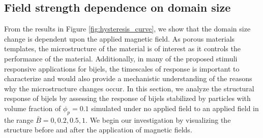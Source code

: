 \subsection{Field strength dependence on domain size}
\label{section:field-strength-dependence-on-domain-size}

From the results in Figure \ref{fig:hysteresis_curve}, we show that the domain size change is dependent upon the applied magnetic field. As porous materials templates,
the microstructure of the material is of interest as it controls the performance of the material. Additionally, in many of the proposed stimuli responsive applications
for bijels, the timescales of response is important to characterize and would also provide a mechanistic understanding of the reasons why the microstructure changes 
occur. In this section, we analyze the structural response of bijels by assessing the response of bijels stabilized by particles with volume fraction of 
$\phi_p = 0.1$ simulated under no applied field to an applied field in the range $\bar{B} = 0, 0.2, 0.5, 1$. We begin our investigation by visualizing the structure before 
and after the application of magnetic fields.

